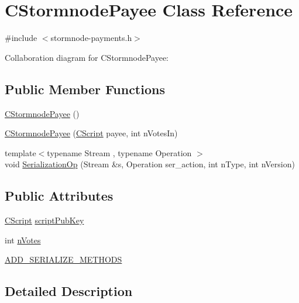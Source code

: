 \hypertarget{class_c_stormnode_payee}{}\section{C\+Stormnode\+Payee Class Reference}
\label{class_c_stormnode_payee}


{\ttfamily \#include $<$stormnode-\/payments.\+h$>$}



Collaboration diagram for C\+Stormnode\+Payee\+:
\subsection*{Public Member Functions}
\begin{DoxyCompactItemize}
\item 
\hyperlink{class_c_stormnode_payee_a43490998b53ca75320ee68ae1f4e42db}{C\+Stormnode\+Payee} ()
\item 
\hyperlink{class_c_stormnode_payee_a28ad7f02f3c812f25bcaa7902f9bac01}{C\+Stormnode\+Payee} (\hyperlink{class_c_script}{C\+Script} payee, int n\+Votes\+In)
\item 
{\footnotesize template$<$typename Stream , typename Operation $>$ }\\void \hyperlink{class_c_stormnode_payee_a780614332a751cd2be40e81992029707}{Serialization\+Op} (Stream \&s, Operation ser\+\_\+action, int n\+Type, int n\+Version)
\end{DoxyCompactItemize}
\subsection*{Public Attributes}
\begin{DoxyCompactItemize}
\item 
\hyperlink{class_c_script}{C\+Script} \hyperlink{class_c_stormnode_payee_acab0a3c2609700241d04323f1727c870}{script\+Pub\+Key}
\item 
int \hyperlink{class_c_stormnode_payee_a83144ad08e6cd31890029ab304d90f98}{n\+Votes}
\item 
\hyperlink{class_c_stormnode_payee_a6d10db1f8809354d8007e78dd6beef40}{A\+D\+D\+\_\+\+S\+E\+R\+I\+A\+L\+I\+Z\+E\+\_\+\+M\+E\+T\+H\+O\+D\+S}
\end{DoxyCompactItemize}


\subsection{Detailed Description}


